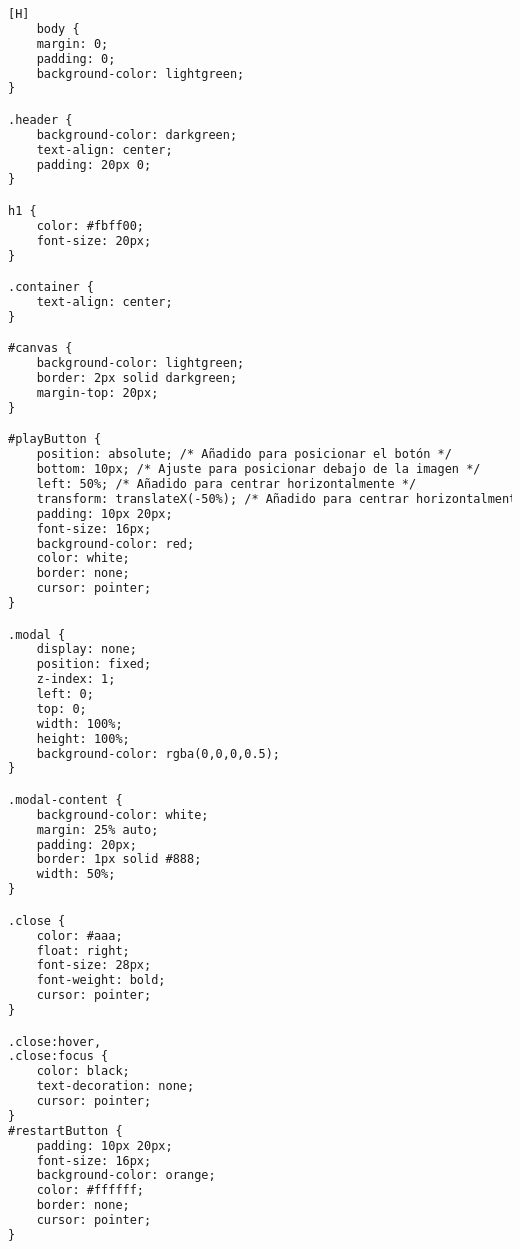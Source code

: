 \documentclass[14pt]{article}
\begin{document}
    \begin{lstlisting}[language=HTML,caption={Code CSS}][H]
    body {
    margin: 0;
    padding: 0;
    background-color: lightgreen;
}

.header {
    background-color: darkgreen;
    text-align: center;
    padding: 20px 0;
}

h1 {
    color: #fbff00;
    font-size: 20px;
}

.container {
    text-align: center;
}

#canvas {
    background-color: lightgreen;
    border: 2px solid darkgreen;
    margin-top: 20px;
}

#playButton {
    position: absolute; /* Añadido para posicionar el botón */
    bottom: 10px; /* Ajuste para posicionar debajo de la imagen */
    left: 50%; /* Añadido para centrar horizontalmente */
    transform: translateX(-50%); /* Añadido para centrar horizontalmente */
    padding: 10px 20px;
    font-size: 16px;
    background-color: red;
    color: white;
    border: none;
    cursor: pointer;
}

.modal {
    display: none;
    position: fixed;
    z-index: 1;
    left: 0;
    top: 0;
    width: 100%;
    height: 100%;
    background-color: rgba(0,0,0,0.5);
}

.modal-content {
    background-color: white;
    margin: 25% auto;
    padding: 20px;
    border: 1px solid #888;
    width: 50%;
}

.close {
    color: #aaa;
    float: right;
    font-size: 28px;
    font-weight: bold;
    cursor: pointer;
}

.close:hover,
.close:focus {
    color: black;
    text-decoration: none;
    cursor: pointer;
}
#restartButton {
    padding: 10px 20px;
    font-size: 16px;
    background-color: orange;
    color: #ffffff;
    border: none;
    cursor: pointer;
}

    \end{lstlisting}
\end{document}
